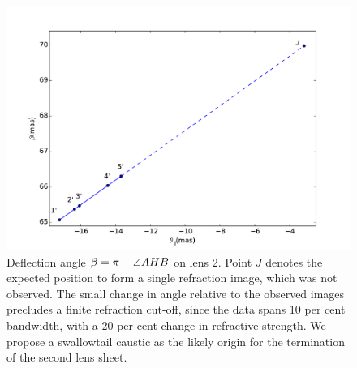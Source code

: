 \documentclass[useAMS,usenatbib]{mn2e}
\begin{document}
\begin{figure}
\centering
\includegraphics[width=1.0\linewidth]{Reflection_angle.pdf}
\caption{Deflection angle $\beta=\pi-\protect\angle AHB$ on lens 2.  Point $J$ denotes the expected position to form a single refraction image, which was not
  observed.   The small change in angle relative to the observed
  images precludes a finite refraction cut-off, since the data spans
  10 per cent bandwidth, with a 20 per cent change in refractive strength.  We
  propose a swallowtail caustic as the likely origin for the
  termination of the second lens sheet.
}
\label{vtrans}
\end{figure}
\end{document}
